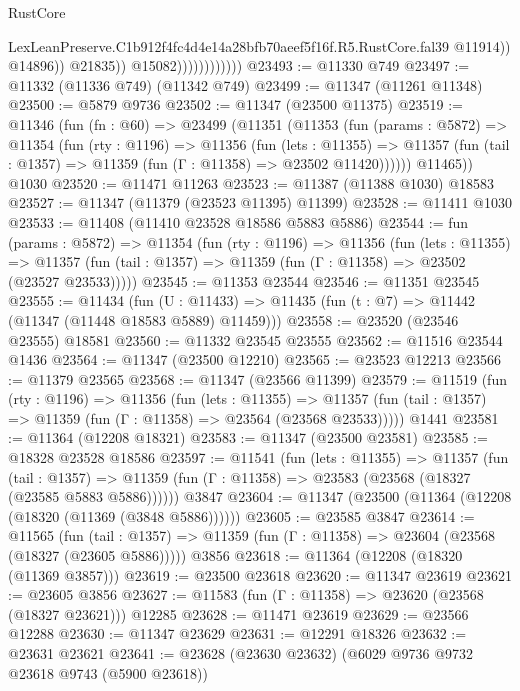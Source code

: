 \begin{lexlean}{RustCore}
\begin{coremodule}
                                        LexLeanPreserve.C1b912f4fc4d4e14a28bfb70aeef5f16f.R5.RustCore.fal39
                                        @11914))
                                    @14896))
                                @21835))
                            @15082))))))))))))
@23493 := @11330 @749
@23497 := @11332 (@11336 @749) (@11342 @749)
@23499 := @11347 (@11261 @11348)
@23500 := @5879 @9736
@23502 := @11347 (@23500 @11375)
@23519 := @11346
    (fun (fn : @60) =>
    @23499
      (@11351
        (@11353
          (fun (params : @5872) =>
          @11354
            (fun (rty : @1196) =>
            @11356
              (fun (lets : @11355) =>
              @11357 (fun (tail : @1357) => @11359 (fun (Γ : @11358) => @23502 @11420))))))
        @11465))
    @1030
@23520 := @11471 @11263
@23523 := @11387 (@11388 @1030) @18583
@23527 := @11347 (@11379 (@23523 @11395) @11399)
@23528 := @11411 @1030
@23533 := @11408 (@11410 @23528 @18586 @5883 @5886)
@23544 := fun (params : @5872) =>
  @11354
    (fun (rty : @1196) =>
    @11356
      (fun (lets : @11355) =>
      @11357 (fun (tail : @1357) => @11359 (fun (Γ : @11358) => @23502 (@23527 @23533)))))
@23545 := @11353 @23544
@23546 := @11351 @23545
@23555 := @11434
    (fun (U : @11433) => @11435 (fun (t : @7) => @11442 (@11347 (@11448 @18583 @5889) @11459)))
@23558 := @23520 (@23546 @23555) @18581
@23560 := @11332 @23545 @23555
@23562 := @11516 @23544 @1436
@23564 := @11347 (@23500 @12210)
@23565 := @23523 @12213
@23566 := @11379 @23565
@23568 := @11347 (@23566 @11399)
@23579 := @11519
    (fun (rty : @1196) =>
    @11356
      (fun (lets : @11355) =>
      @11357 (fun (tail : @1357) => @11359 (fun (Γ : @11358) => @23564 (@23568 @23533)))))
    @1441
@23581 := @11364 (@12208 @18321)
@23583 := @11347 (@23500 @23581)
@23585 := @18328 @23528 @18586
@23597 := @11541
    (fun (lets : @11355) =>
    @11357
      (fun (tail : @1357) =>
      @11359 (fun (Γ : @11358) => @23583 (@23568 (@18327 (@23585 @5883 @5886))))))
    @3847
@23604 := @11347 (@23500 (@11364 (@12208 (@18320 (@11369 (@3848 @5886))))))
@23605 := @23585 @3847
@23614 := @11565
    (fun (tail : @1357) => @11359 (fun (Γ : @11358) => @23604 (@23568 (@18327 (@23605 @5886)))))
    @3856
@23618 := @11364 (@12208 (@18320 (@11369 @3857)))
@23619 := @23500 @23618
@23620 := @11347 @23619
@23621 := @23605 @3856
@23627 := @11583 (fun (Γ : @11358) => @23620 (@23568 (@18327 @23621))) @12285
@23628 := @11471 @23619
@23629 := @23566 @12288
@23630 := @11347 @23629
@23631 := @12291 @18326
@23632 := @23631 @23621
@23641 := @23628 (@23630 @23632) (@6029 @9736 @9732 @23618 @9743 (@5900 @23618))

\end{coremodule}
\end{lexlean}
